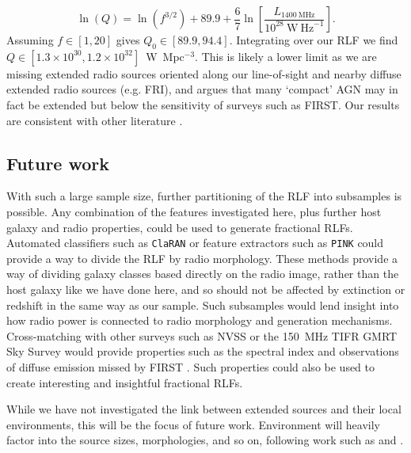       \begin{equation}
        \ln (Q) = \ln (f^{3/2}) + 89.9 + \frac{6}{7} \ln \left[\frac{L_{1400~\mathrm{MHz}}}{10^{28}~\mathrm{W\ Hz}^{-1}}\right].
      \end{equation}
      Assuming $f \in [1, 20]$ gives $Q_0 \in [89.9, 94.4]$. Integrating over our RLF we find $Q \in [1.3 \times 10^{30}, 1.2 \times 10^{32}]$~W~Mpc$^{-3}$. This is likely a lower limit as we are missing extended radio sources oriented along our line-of-sight and nearby diffuse extended radio sources (e.g. FRI), and \citet{shabala18plane} argues that many `compact' AGN may in fact be extended but below the sensitivity of surveys such as FIRST. Our results are consistent with other literature \citep[e.g][who estimated the energy contribution as $7 \times 10^{31}$ W~Mpc$^{-3}$]{hardcastle19rlagn}.

  \subsection{Future work}

    With such a large sample size, further partitioning of the RLF into subsamples is possible. Any combination of the features investigated here, plus further host galaxy and radio properties, could be used to generate fractional RLFs. Automated classifiers such as \texttt{ClaRAN} \citep{wu19claran} or feature extractors such as \texttt{PINK} \citep{polsterer15pink,galvin19som,ralph19ae} could provide a way to divide the RLF by radio morphology. These methods provide a way of dividing galaxy classes based directly on the radio image, rather than the host galaxy like we have done here, and so should not be affected by extinction or redshift in the same way as our sample. Such subsamples would lend insight into how radio power is connected to radio morphology and generation mechanisms. Cross-matching with other surveys such as NVSS or the 150~MHz TIFR GMRT Sky Survey would provide properties such as the spectral index and observations of diffuse emission missed by FIRST \citep[as used by][]{kimball08}. Such properties could also be used to create interesting and insightful fractional RLFs.

    While we have not investigated the link between extended sources and their local environments, this will be the focus of future work. Environment will heavily factor into the source sizes, morphologies, and so on, following work such as \citet{rodman19asymmetry} and \citet{garon19bending}.

